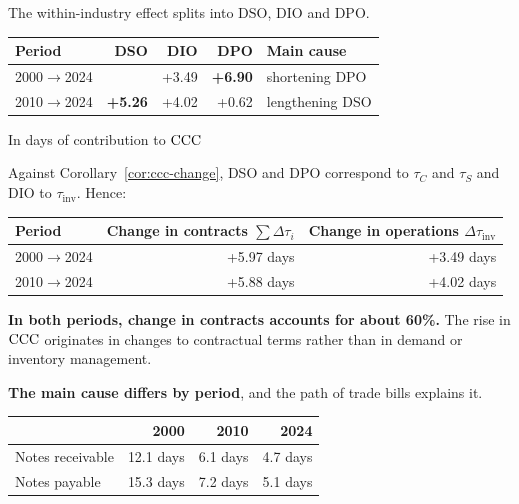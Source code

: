 The within-industry effect splits into $\mathrm{DSO}$, $\mathrm{DIO}$ and $\mathrm{DPO}$.

\begin{center}
\begin{tabular}{@{}lrrrl@{}}
\toprule
Period & DSO & DIO & DPO & Main cause \\
\midrule
2000$\to$2024 & \textminus 0.93 & +3.49 & \textbf{+6.90} & shortening DPO \\
2010$\to$2024 & \textbf{+5.26} & +4.02 & +0.62 & lengthening DSO \\
\bottomrule
\end{tabular}
\label{tab:within-industry-decomposition}
\end{center}
\begin{center}\footnotesize In days of contribution to $\mathrm{CCC}$\end{center}

Against Corollary~\ref{cor:ccc-change}, DSO and DPO correspond to $\tau_C$ and $\tau_S$ and
DIO to $\tau_{\mathrm{inv}}$. Hence:

\begin{center}
\begin{tabular}{@{}lrr@{}}
\toprule
Period & Change in contracts $\sum\Delta\tau_i$ & Change in operations $\Delta\tau_{\mathrm{inv}}$ \\
\midrule
2000$\to$2024 & +5.97 days & +3.49 days \\
2010$\to$2024 & +5.88 days & +4.02 days \\
\bottomrule
\end{tabular}
\label{tab:contract-vs-operation-change}
\end{center}

\textbf{In both periods, change in contracts accounts for about 60\%.} The rise in $\mathrm{CCC}$
originates in changes to contractual terms rather than in demand or inventory management.

\textbf{The main cause differs by period}, and the path of trade bills explains it.

\begin{center}
\begin{tabular}{@{}lrrr@{}}
\toprule
 & 2000 & 2010 & 2024 \\
\midrule
Notes receivable & 12.1 days & 6.1 days & 4.7 days \\
Notes payable & 15.3 days & 7.2 days & 5.1 days \\
\bottomrule
\end{tabular}
\label{tab:tegata-trend}
\end{center}

